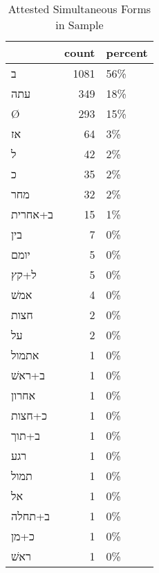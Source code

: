 \begin{table}[htbp!]
\centering
\caption{Attested Simultaneous Forms in Sample}
\label{table:sim_front}
\begin{tabular}{lrl}
\toprule
{} &  count & percent \\
\midrule
\texthebrew{ב}       &   1081 &     56\% \\
\texthebrew{עתה}     &    349 &     18\% \\
\texthebrew{Ø}       &    293 &     15\% \\
\texthebrew{אז}      &     64 &      3\% \\
\texthebrew{ל}       &     42 &      2\% \\
\texthebrew{כ}       &     35 &      2\% \\
\texthebrew{מחר}     &     32 &      2\% \\
\texthebrew{ב+אחרית} &     15 &      1\% \\
\texthebrew{בין}     &      7 &      0\% \\
\texthebrew{יומם}    &      5 &      0\% \\
\texthebrew{ל+קץ}    &      5 &      0\% \\
\texthebrew{אמשׁ}    &      4 &      0\% \\
\texthebrew{חצות}    &      2 &      0\% \\
\texthebrew{על}      &      2 &      0\% \\
\texthebrew{אתמול}   &      1 &      0\% \\
\texthebrew{ב+ראשׁ}  &      1 &      0\% \\
\texthebrew{אחרון}   &      1 &      0\% \\
\texthebrew{כ+חצות}  &      1 &      0\% \\
\texthebrew{ב+תוך}   &      1 &      0\% \\
\texthebrew{רגע}     &      1 &      0\% \\
\texthebrew{תמול}    &      1 &      0\% \\
\texthebrew{אל}      &      1 &      0\% \\
\texthebrew{ב+תחלה}  &      1 &      0\% \\
\texthebrew{כ+מן}    &      1 &      0\% \\
\texthebrew{ראשׁ}    &      1 &      0\% \\
\bottomrule
\end{tabular}
\end{table}
